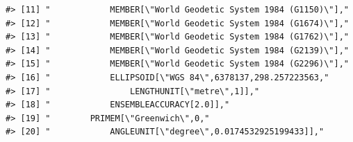 \documentclass[
]{book}
\begin{document}
\begin{verbatim}
#> [11] "            MEMBER[\"World Geodetic System 1984 (G1150)\"],"                                                                                                                                                                                                                    
#> [12] "            MEMBER[\"World Geodetic System 1984 (G1674)\"],"                                                                                                                                                                                                                    
#> [13] "            MEMBER[\"World Geodetic System 1984 (G1762)\"],"                                                                                                                                                                                                                    
#> [14] "            MEMBER[\"World Geodetic System 1984 (G2139)\"],"                                                                                                                                                                                                                    
#> [15] "            MEMBER[\"World Geodetic System 1984 (G2296)\"],"                                                                                                                                                                                                                    
#> [16] "            ELLIPSOID[\"WGS 84\",6378137,298.257223563,"                                                                                                                                                                                                                        
#> [17] "                LENGTHUNIT[\"metre\",1]],"                                                                                                                                                                                                                                      
#> [18] "            ENSEMBLEACCURACY[2.0]],"                                                                                                                                                                                                                                            
#> [19] "        PRIMEM[\"Greenwich\",0,"                                                                                                                                                                                                                                                
#> [20] "            ANGLEUNIT[\"degree\",0.0174532925199433]],"                                                                                                                                                                                                                         

\end{verbatim}
\end{document}
